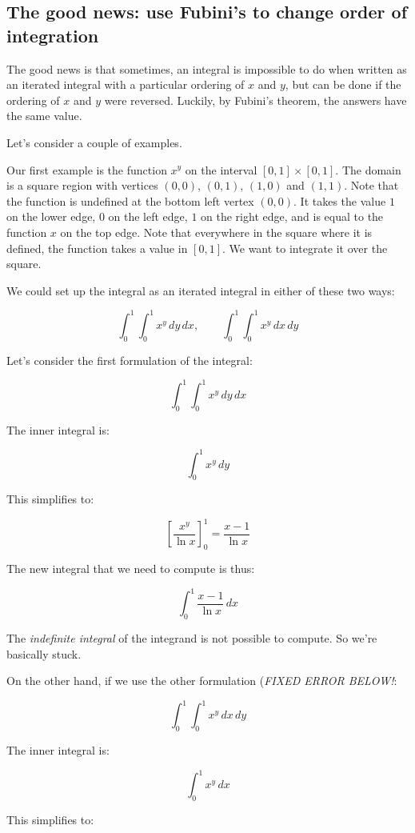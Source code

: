 \documentclass[10pt]{amsart}
\begin{document}
\subsection{The good news: use Fubini's to change order of integration}

The good news is that sometimes, an integral is impossible to do when
written as an iterated integral with a particular ordering of $x$ and
$y$, but can be done if the ordering of $x$ and $y$ were
reversed. Luckily, by Fubini's theorem, the answers have the same
value.

Let's consider a couple of examples.

Our first example is the function $x^y$ on the interval $[0,1] \times
[0,1]$. The domain is a square region with vertices $(0,0)$, $(0,1)$,
$(1,0)$ and $(1,1)$. Note that the function is undefined at the bottom
left vertex $(0,0)$. It takes the value $1$ on the lower edge, $0$ on
the left edge, $1$ on the right edge, and is equal to the function $x$
on the top edge. Note that everywhere in the square where it is
defined, the function takes a value in $[0,1]$. We want to integrate
it over the square.

We could set up the integral as an iterated integral in either of
these two ways:

$$\int_0^1 \int_0^1 x^y \, dy \, dx, \qquad \int_0^1 \int_0^1 x^y \, dx \, dy$$

Let's consider the first formulation of the integral:

$$\int_0^1 \int_0^1 x^y \, dy \, dx$$

The inner integral is:

$$\int_0^1 x^y \, dy$$

This simplifies to:

$$\left[\frac{x^y}{\ln x}\right]_0^1 = \frac{x - 1}{\ln x}$$

The new integral that we need to compute is thus:

$$\int_0^1 \frac{x - 1}{\ln x} \, dx$$

The {\em indefinite integral} of the integrand is not possible to
compute. So we're basically stuck.

On the other hand, if we use the other formulation ({\em FIXED ERROR
  BELOW!}:

$$\int_0^1 \int_0^1 x^y \, dx \, dy$$

The inner integral is:

$$\int_0^1 x^y \, dx$$

This simplifies to:
\end{document}
